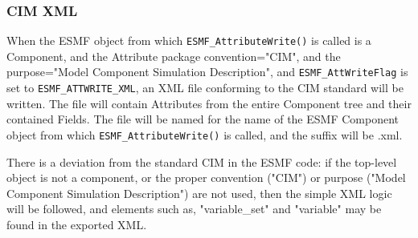 \subsubsection{CIM XML}

\begin{sloppypar}
When the ESMF object from which {\tt ESMF\_AttributeWrite()} is called is a Component, and the Attribute package convention="CIM", and the purpose="Model Component Simulation Description", and {\tt ESMF\_AttWriteFlag} is set to {\tt ESMF\_ATTWRITE\_XML}, an XML file conforming to the CIM standard will be written.  The file will contain Attributes from the entire Component tree and their contained Fields.  The file will be named for the name of the ESMF Component object from which {\tt ESMF\_AttributeWrite()} is called, and the suffix will be .xml.
\end{sloppypar}

\begin{sloppypar}
There is a deviation from the standard CIM in the ESMF code: if the top-level object is not a component, or the proper convention ("CIM") or purpose ("Model Component Simulation Description") are not used, then the simple XML logic will be followed, and elements such as, "variable\_set" and "variable" may be found in the exported XML.  
\end{sloppypar}
